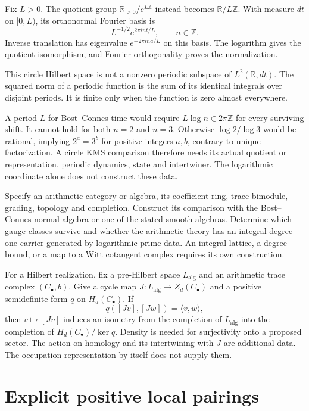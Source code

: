 Fix $L>0$. The quotient group $\mathbb R_{>0}/e^{L\mathbb Z}$ instead
becomes $\mathbb R/L\mathbb Z$. With measure $dt$ on $[0,L)$, its
orthonormal Fourier basis is
\[
 L^{-1/2}e^{2\pi int/L},\qquad n\in\mathbb Z.
\]
Inverse translation has eigenvalue $e^{-2\pi ina/L}$ on this basis. The
logarithm gives the quotient isomorphism, and Fourier orthogonality proves
the normalization.

This circle Hilbert space is not a nonzero periodic subspace of $L^2(\mathbb
R,dt)$. The squared norm of a periodic function is the sum of its identical
integrals over disjoint periods. It is finite only when the function is zero
almost everywhere.

A period $L$ for Bost--Connes time would require $L\log n\in2\pi\mathbb Z$
for every surviving shift. It cannot hold for both $n=2$ and $n=3$.
Otherwise $\log2/\log3$ would be rational, implying $2^a=3^b$ for positive
integers $a,b$, contrary to unique factorization. A circle KMS comparison
therefore needs its actual quotient or representation, periodic dynamics,
state and intertwiner. The logarithmic coordinate alone does not construct
these data.

\begin{question}
\label{v4-arith:traces:bc-comparison}
Specify an arithmetic category or algebra, its coefficient ring, trace
bimodule, grading, topology and completion. Construct its comparison with
the Bost--Connes normal algebra or one of the stated smooth algebras.
Determine which gauge classes survive and whether the arithmetic theory has
an integral degree-one carrier generated by logarithmic prime data. An
integral lattice, a degree bound, or a map to a Witt cotangent complex
requires its own construction.
\end{question}

For a Hilbert realization, fix a pre-Hilbert space $L_{\mathrm{alg}}$ and an
arithmetic trace complex $(C_\bullet,b)$. Give a cycle map
$J:L_{\mathrm{alg}}\to Z_d(C_\bullet)$ and a positive semidefinite form $q$
on $H_d(C_\bullet)$. If
\[
 q([Jv],[Jw])=\langle v,w\rangle,
\]
then $v\mapsto[Jv]$ induces an isometry from the completion of
$L_{\mathrm{alg}}$ into the completion of $H_d(C_\bullet)/\ker q$. Density
is needed for surjectivity onto a proposed sector. The action on homology
and its intertwining with $J$ are additional data. The occupation
representation by itself does not supply them.

\section{Explicit positive local pairings}

